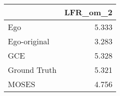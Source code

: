 \begin{tabular}{lr}
\toprule
{} & LFR_om_2 \\
\midrule
Ego          &    5.333 \\
Ego-original &    3.283 \\
GCE          &    5.328 \\
Ground Truth &    5.321 \\
MOSES        &    4.756 \\
\bottomrule
\end{tabular}
